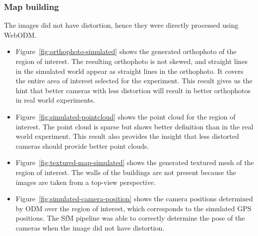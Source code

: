 \subsubsection{Map building}
The images did not have distortion, hence they were directly processed using WebODM.
\begin{itemize}
	\item Figure~\ref{fig:orthophoto-simulated} shows the generated orthophoto of the region of interest. The resulting orthophoto is not skewed, and straight lines in the simulated world appear as straight lines in the orthophoto. It covers the entire area of interest selected for the experiment. This result gives us the hint that better cameras with less distortion will result in better orthophotos in real world experiments.
	\item Figure~\ref{fig:simulated-pointcloud} shows the point cloud for the region of interest. The point cloud is sparse but shows better definition than in the real world experiment. This result also provides the insight that less distorted cameras should provide better point clouds.
	\item Figure~\ref{fig:textured-map-simulated} shows the generated textured mesh of the region of interest. The walls of the buildings are not present because the images are taken from a top-view perspective.
	\item Figure~\ref{fig:simulated-camera-position} shows the camera positions determined by ODM over the region of interest, which corresponds to the simulated GPS positions. The SfM pipeline was able to correctly determine the pose of the cameras when the image did not have distortion.  
\end{itemize}

